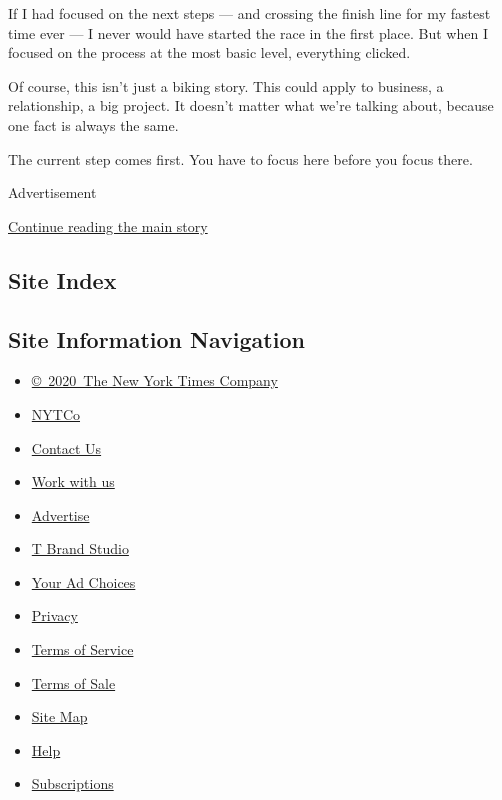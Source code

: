 If I had focused on the next steps --- and crossing the finish line for
my fastest time ever --- I never would have started the race in the
first place. But when I focused on the process at the most basic level,
everything clicked.

Of course, this isn't just a biking story. This could apply to business,
a relationship, a big project. It doesn't matter what we're talking
about, because one fact is always the same.

The current step comes first. You have to focus here before you focus
there.

Advertisement

\protect\hyperlink{after-bottom}{Continue reading the main story}

\hypertarget{site-index}{%
\subsection{Site Index}\label{site-index}}

\hypertarget{site-information-navigation}{%
\subsection{Site Information
Navigation}\label{site-information-navigation}}

\begin{itemize}
\tightlist
\item
  \href{https://help.nytimes3xbfgragh.onion/hc/en-us/articles/115014792127-Copyright-notice}{©~2020~The
  New York Times Company}
\end{itemize}

\begin{itemize}
\tightlist
\item
  \href{https://www.nytco.com/}{NYTCo}
\item
  \href{https://help.nytimes3xbfgragh.onion/hc/en-us/articles/115015385887-Contact-Us}{Contact
  Us}
\item
  \href{https://www.nytco.com/careers/}{Work with us}
\item
  \href{https://nytmediakit.com/}{Advertise}
\item
  \href{http://www.tbrandstudio.com/}{T Brand Studio}
\item
  \href{https://www.nytimes3xbfgragh.onion/privacy/cookie-policy\#how-do-i-manage-trackers}{Your
  Ad Choices}
\item
  \href{https://www.nytimes3xbfgragh.onion/privacy}{Privacy}
\item
  \href{https://help.nytimes3xbfgragh.onion/hc/en-us/articles/115014893428-Terms-of-service}{Terms
  of Service}
\item
  \href{https://help.nytimes3xbfgragh.onion/hc/en-us/articles/115014893968-Terms-of-sale}{Terms
  of Sale}
\item
  \href{https://spiderbites.nytimes3xbfgragh.onion}{Site Map}
\item
  \href{https://help.nytimes3xbfgragh.onion/hc/en-us}{Help}
\item
  \href{https://www.nytimes3xbfgragh.onion/subscription?campaignId=37WXW}{Subscriptions}
\end{itemize}
